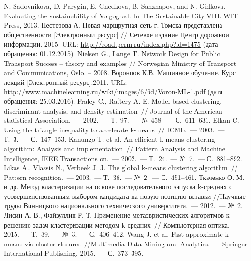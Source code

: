 \renewcommand{\bibname}{%
    \vspace{-1em}\begin{center}
        Список используемой литературы
    \end{center}\vspace{-2em}
}

\pagestyle{empty}

\begin{thebibliography}{99}
     N. Sadovnikova, D. Parygin, E. Gnedkova, B. Sanzhapov, and N. Gidkova. 
        Evaluating the sustainability of Volgograd. In The Sustainable City VIII. WIT Press, 2013.
     Нестерова А. Новая маршрутная сеть г. Томска представлена общественности 
        [Электронный ресурс] // Сетевое издание Центр дорожной информации. 2015. URL: 
        \url{http://road.perm.ru/index.php?id=1475} (дата обращения: 01.12.2015).
     Nielsen G., Lange T. Network Design for Public Transport Success -- theory and 
        examples // Norwegian Ministry of Transport and Communications, Oslo. -- 2008.
     Воронцов К.В. Машинное обучение. Курс лекций [Электронный ресурс].2011. URL: \url{http://www.machinelearning.ru/wiki/images/6/6d/Voron-ML-1.pdf} (дата обращения: 25.03.2016).
     Fraley C., Raftery A. E. Model-based clustering, discriminant analysis, and density estimation~// Journal of the American statistical Association.~--- 2002.~--- Т.~97.~--- №~458.~--- С.~611--631.
     Elkan C. Using the triangle inequality to accelerate k-means~// ICML.~--- 2003.~--- Т.~3.~--- С.~147--153.
     Kanungo T. et al. An efficient k-means clustering algorithm: Analysis and implementation~// Pattern Analysis and Machine Intelligence, IEEE Transactions on.~--- 2002.~--- Т.~24.~--- №~7.~--- С.~881--892.
     Likas A., Vlassis N., Verbeek J. J. The global k-means clustering algorithm~// Pattern recognition.~--- 2003.~--- Т.~36.~--- №~2.~--- С.~451--461.
     Ткаченко О. М. и др. Метод кластеризации на основе последовательного запуска k-средних с усовершенствованным выбором кандидата на новую позицию вставки //Научные труды Винницкого национального технического университета.~--- 2012.~--- №~2.
     Лисин А. В., Файзуллин Р. Т. Применение метаэвристических алгоритмов к решению задач кластеризации методом k-средних~// Компьютерная оптика.~--- 2015.~--- Т.~39.~--- №~3.~--- С.~406--412.
     Wang J. et al. Fast approximate k-means via cluster closures~//Multimedia Data Mining and Analytics.~--- Springer International Publishing, 2015.~--- С.~373--395.

\end{thebibliography}
